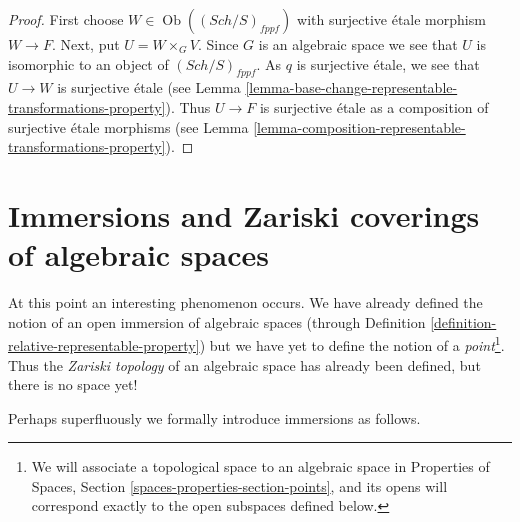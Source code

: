 \documentclass{stacks-project}
\theoremstyle{plain}
\theoremstyle{definition}
\theoremstyle{remark}
\numberwithin{equation}{subsection}
\def\Sch{\mathit{Sch}}
\def\Ob{\mathop{\mathrm{Ob}}\nolimits}
\begin{document}
\begin{proof}
First choose $W \in \Ob((\Sch/S)_{fppf})$
with surjective \'etale morphism $W \to F$.
Next, put $U = W \times_G V$. Since $G$ is an algebraic space
we see that $U$ is isomorphic to an object of $(\Sch/S)_{fppf}$.
As $q$ is surjective \'etale, we see that $U \to W$ is surjective
\'etale (see
Lemma \ref{lemma-base-change-representable-transformations-property}).
Thus $U \to F$ is surjective \'etale as a composition of surjective
\'etale morphisms (see
Lemma \ref{lemma-composition-representable-transformations-property}).
\end{proof}



























\section{Immersions and Zariski coverings of algebraic spaces}
\label{section-Zariski}

\noindent
At this point an interesting phenomenon occurs. We have already defined
the notion of an open immersion of algebraic spaces (through
Definition \ref{definition-relative-representable-property})
but we have yet to define the notion of a {\it point}\footnote{We
will associate a topological space to an algebraic space in
Properties of Spaces, Section
\ref{spaces-properties-section-points},
and its opens will correspond exactly to the open subspaces defined below.}.
Thus the {\it Zariski topology} of an algebraic space
has already been defined, but there is no space yet!

\medskip\noindent
Perhaps superfluously we formally introduce immersions as follows.
\end{document}

